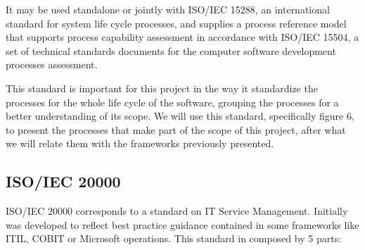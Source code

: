 It may be used standalone or jointly with ISO/IEC 15288\cite{ISO15288}, an international standard for system life cycle processes, and supplies a process reference model that supports process capability assessment in accordance with ISO/IEC 15504\cite{ISO15504}, a set of technical standards documents for the computer software development processes assessment.\par
This standard is important for this project in the way it standardize the processes for the whole life cycle of the software, grouping the processes for a better understanding of its scope. We will use this standard, specifically figure 6, to present the processes that make part of the scope of this project, after what we will relate them with the frameworks previously presented. 


\subsection{ISO/IEC 20000}

ISO/IEC 20000 corresponds to a standard on IT Service Management. Initially was developed to reflect best practice guidance contained in some frameworks like ITIL, COBIT or Microsoft operations. This standard in composed by 5 parts:

